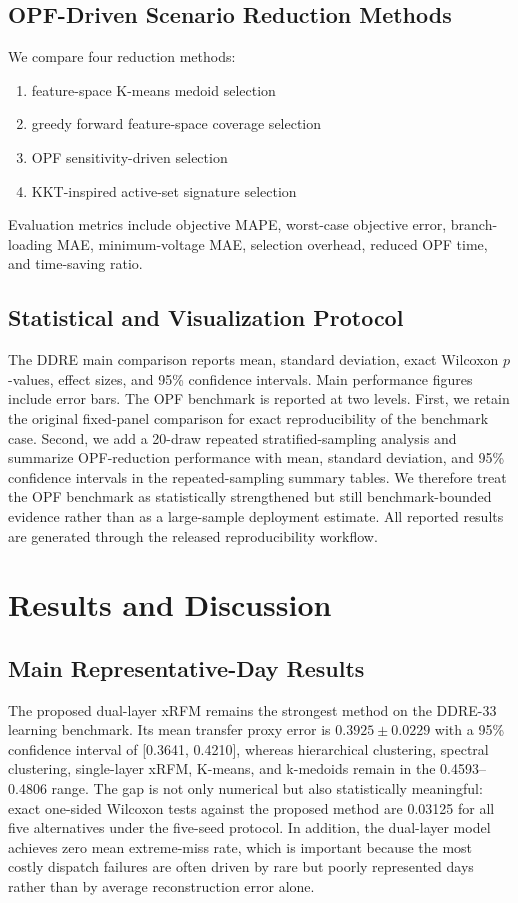 \documentclass[journal]{IEEEtran}
\begin{document}
\subsection{OPF-Driven Scenario Reduction Methods}
We compare four reduction methods:
\begin{enumerate}
\item feature-space K-means medoid selection
\item greedy forward feature-space coverage selection
\item OPF sensitivity-driven selection
\item KKT-inspired active-set signature selection
\end{enumerate}
Evaluation metrics include objective MAPE, worst-case objective error, branch-loading MAE, minimum-voltage MAE, selection overhead, reduced OPF time, and time-saving ratio.

\subsection{Statistical and Visualization Protocol}
The DDRE main comparison reports mean, standard deviation, exact Wilcoxon $p$-values, effect sizes, and 95\% confidence intervals. Main performance figures include error bars. The OPF benchmark is reported at two levels. First, we retain the original fixed-panel comparison for exact reproducibility of the benchmark case. Second, we add a 20-draw repeated stratified-sampling analysis and summarize OPF-reduction performance with mean, standard deviation, and 95\% confidence intervals in the repeated-sampling summary tables. We therefore treat the OPF benchmark as statistically strengthened but still benchmark-bounded evidence rather than as a large-sample deployment estimate. All reported results are generated through the released reproducibility workflow.

\section{Results and Discussion}
\subsection{Main Representative-Day Results}
The proposed dual-layer xRFM remains the strongest method on the DDRE-33 learning benchmark. Its mean transfer proxy error is $0.3925\pm0.0229$ with a 95\% confidence interval of [0.3641, 0.4210], whereas hierarchical clustering, spectral clustering, single-layer xRFM, K-means, and k-medoids remain in the 0.4593--0.4806 range. The gap is not only numerical but also statistically meaningful: exact one-sided Wilcoxon tests against the proposed method are 0.03125 for all five alternatives under the five-seed protocol. In addition, the dual-layer model achieves zero mean extreme-miss rate, which is important because the most costly dispatch failures are often driven by rare but poorly represented days rather than by average reconstruction error alone.
\end{document}
